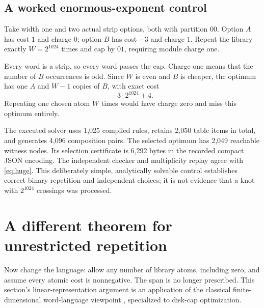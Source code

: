 \documentclass[11pt,a4paper]{article}
\theoremstyle{definition}
\begin{document}
\subsection{A worked enormous-exponent control}\label{sec:huge}
Take width one and two actual strip options, both with partition $00$. Option $A$ has cost $1$ and charge $0$; option $B$ has cost $-3$ and charge $1$. Repeat the library exactly $W=2^{1024}$ times and cap by $01$, requiring module charge one.

Every word is a strip, so every word passes the cap. Charge one means that the number of $B$ occurrences is odd. Since $W$ is even and $B$ is cheaper, the optimum has one $A$ and $W-1$ copies of $B$, with exact cost
\begin{equation}
-3\cdot2^{1024}+4.
\label{eq:huge}
\end{equation}
Repeating one chosen atom $W$ times would have charge zero and miss this optimum entirely.

The executed solver uses 1,025 compiled rules, retains 2,050 table items in total, and generates 4,096 composition pairs. The selected optimum has 2,049 reachable witness nodes. Its selection certificate is 6,292 bytes in the recorded compact JSON encoding. The independent checker and multiplicity replay agree with \eqref{eq:huge}. This deliberately simple, analytically solvable control establishes correct binary repetition and independent choices; it is not evidence that a knot with $2^{1024}$ crossings was processed.

\section{A different theorem for unrestricted repetition}\label{sec:pumping}

Now change the language: allow any number of library atoms, including zero, and assume every atomic cost is nonnegative. The span is no longer prescribed. This section's linear-representation argument is an application of the classical finite-dimensional word-language viewpoint \cite{rational}, specialized to disk-cap optimization.
\end{document}
